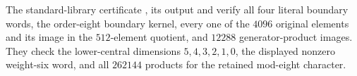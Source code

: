 The standard-library certificate
,
its output and
verify all four literal boundary words, the order-eight boundary
kernel, every one of the \(4096\) original elements and its image
in the \(512\)-element quotient, and \(12288\) generator-product
images.  They check the lower-central dimensions
\(5,4,3,2,1,0\), the displayed nonzero weight-six word, and all
\(262144\) products for the retained mod-eight character.
